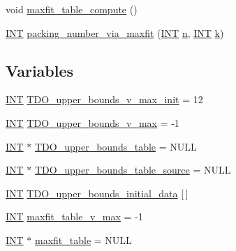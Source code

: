 \begin{DoxyCompactItemize}
\item 
void \mbox{\hyperlink{_l_i_b_2_i_n_c_i_d_e_n_c_e_2packing_8_c_a18906bf8fc3d2c43ee8a59ff5cd3f712}{maxfit\+\_\+table\+\_\+compute}} ()
\item 
\mbox{\hyperlink{galois_8h_a09fddde158a3a20bd2dcadb609de11dc}{I\+NT}} \mbox{\hyperlink{_l_i_b_2_i_n_c_i_d_e_n_c_e_2packing_8_c_afb1c5724d95242807559426901c7766b}{packing\+\_\+number\+\_\+via\+\_\+maxfit}} (\mbox{\hyperlink{galois_8h_a09fddde158a3a20bd2dcadb609de11dc}{I\+NT}} \mbox{\hyperlink{simeon_8_c_a7f2cd26777ce0ff3fdaf8d02aacbddfb}{n}}, \mbox{\hyperlink{galois_8h_a09fddde158a3a20bd2dcadb609de11dc}{I\+NT}} \mbox{\hyperlink{simeon_8_c_a43fa990200c3ddd47c35f151bd4d66bf}{k}})
\end{DoxyCompactItemize}
\subsection*{Variables}
\begin{DoxyCompactItemize}
\item 
\mbox{\hyperlink{galois_8h_a09fddde158a3a20bd2dcadb609de11dc}{I\+NT}} \mbox{\hyperlink{_l_i_b_2_i_n_c_i_d_e_n_c_e_2packing_8_c_a02bf9f3f3d7cd41b31bdf2d325cf3242}{T\+D\+O\+\_\+upper\+\_\+bounds\+\_\+v\+\_\+max\+\_\+init}} = 12
\item 
\mbox{\hyperlink{galois_8h_a09fddde158a3a20bd2dcadb609de11dc}{I\+NT}} \mbox{\hyperlink{_l_i_b_2_i_n_c_i_d_e_n_c_e_2packing_8_c_a67a55b1527ea85e07835542661e2520d}{T\+D\+O\+\_\+upper\+\_\+bounds\+\_\+v\+\_\+max}} = -\/1
\item 
\mbox{\hyperlink{galois_8h_a09fddde158a3a20bd2dcadb609de11dc}{I\+NT}} $\ast$ \mbox{\hyperlink{_l_i_b_2_i_n_c_i_d_e_n_c_e_2packing_8_c_ad50561446b32573999be3a37ce386bec}{T\+D\+O\+\_\+upper\+\_\+bounds\+\_\+table}} = N\+U\+LL
\item 
\mbox{\hyperlink{galois_8h_a09fddde158a3a20bd2dcadb609de11dc}{I\+NT}} $\ast$ \mbox{\hyperlink{_l_i_b_2_i_n_c_i_d_e_n_c_e_2packing_8_c_afd7f5b9597f90ba79fb2161c633e7559}{T\+D\+O\+\_\+upper\+\_\+bounds\+\_\+table\+\_\+source}} = N\+U\+LL
\item 
\mbox{\hyperlink{galois_8h_a09fddde158a3a20bd2dcadb609de11dc}{I\+NT}} \mbox{\hyperlink{_l_i_b_2_i_n_c_i_d_e_n_c_e_2packing_8_c_a59e445dde78bef3bfa6157f8d832cab7}{T\+D\+O\+\_\+upper\+\_\+bounds\+\_\+initial\+\_\+data}} \mbox{[}$\,$\mbox{]}
\item 
\mbox{\hyperlink{galois_8h_a09fddde158a3a20bd2dcadb609de11dc}{I\+NT}} \mbox{\hyperlink{_l_i_b_2_i_n_c_i_d_e_n_c_e_2packing_8_c_a5fb731adb56aab6639c9bbabf0645add}{maxfit\+\_\+table\+\_\+v\+\_\+max}} = -\/1
\item 
\mbox{\hyperlink{galois_8h_a09fddde158a3a20bd2dcadb609de11dc}{I\+NT}} $\ast$ \mbox{\hyperlink{_l_i_b_2_i_n_c_i_d_e_n_c_e_2packing_8_c_a5e11ca4081363787ae484803f8208629}{maxfit\+\_\+table}} = N\+U\+LL
\end{DoxyCompactItemize}


